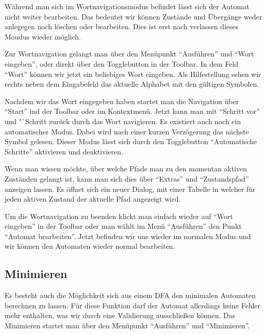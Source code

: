   Während man sich im Wortnavigationsmodus befindet lässt sich der Automat nicht
  weiter bearbeiten. Das bedeutet wir können Zustände und Übergänge weder
  anlegegen noch löschen oder bearbeiten. Dies ist erst nach verlassen dieses
  Moudus wieder möglich.\vspace{10pt}
  
  Zur Wortnavigation gelangt man über den Menüpunkt "`Ausführen"' und "`Wort
  eingeben"', oder direkt über den Togglebutton in der Toolbar. In dem Feld
  "`Wort"' können wir jetzt ein beliebiges Wort eingeben. Als Hilfestellung sehen
  wir rechts neben dem Eingabefeld das aktuelle Alphabet mit den gültigen
  Symbolen.\vspace{10pt}
  
  Nachdem wir das Wort eingegeben haben startet man die Navigation über "`Start"'
  ind der Toolbar oder im Kontextmenü. Jetzt kann man mit "`Schritt vor"' und
  "`Schritt zurück durch das Wort navigieren. Es existiert auch noch ein
  automatischer Modus. Dabei wird nach einer kurzen Verzögerung das nächste
  Symbol gelesen. Dieser Modus lässt sich durch den Togglebutton "`Automatische
  Schritte"' aktivieren und deaktivieren.\vspace{10pt}
  
  Wenn man wissen möchte, über welche Pfade man zu den momentan aktiven Zuständen
  gelangt ist, kann man sich dies über "`Extras"' und "`Zustandspfad"' anzeigen
  lassen. Es öffnet sich ein neuer Dialog, mit einer Tabelle in welcher für jeden
  aktiven Zustand der aktuelle Pfad angezeigt wird.\vspace{10pt}
  
  Um die Wortnavigation zu beenden klickt man einfach wieder auf "`Wort
  eingeben"' in der Toolbar oder man wählt im Menü "`Ausführen"' den Punkt
  "`Automat bearbeiten"'. Jetzt befinden wir uns wieder im normalen Modus und wir
  können den Automaten wieder normal bearbeiten.
   
\subsection{Minimieren}
  
  Es besteht auch die Möglichkeit sich aus einem DFA den minimalen Automaten
  berechnen zu lassen. Für diese Funktion darf der Automat allerdings keine
  Fehler mehr enthalten, was wir durch eine Validierung ausschließen können. Das
  Minimieren startet man über den Menüpunkt "`Ausführen"' und
  "`Minimieren"'.\vspace{10pt}
  
